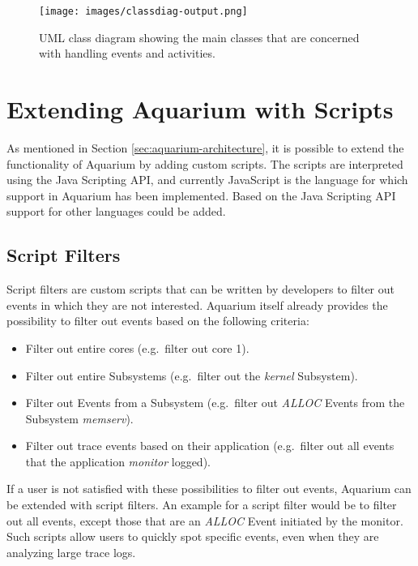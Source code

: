\documentclass[a4paper,11pt,twoside]{report}
\begin{document}
\begin{figure}[htb]
	\texttt{[image: images/classdiag-output.png]}
	\caption{UML class diagram showing the main classes that are concerned with
	handling events and activities.}
	\label{fig:classdiag-output}
\end{figure}

\section{Extending Aquarium with Scripts\label{sec:scripts}}

As mentioned in Section \ref{sec:aquarium-architecture}, it is possible to
extend the functionality of Aquarium by adding custom scripts. The scripts are
interpreted using the Java Scripting API, and currently JavaScript is the
language for which support in Aquarium has been implemented. Based on the Java
Scripting API support for other languages could be added.

\subsection{Script Filters}

Script filters are custom scripts that can be written by developers to filter
out events in which they are not interested. Aquarium itself already provides
the possibility to filter out events based on the following criteria:

\begin{itemize}
	\item Filter out entire cores (e.g.~filter out core 1).
	\item Filter out entire Subsystems (e.g.~filter out the \emph{kernel}
		Subsystem).
	\item Filter out Events from a Subsystem (e.g.~filter out \emph{ALLOC}
		Events from the Subsystem \emph{memserv}).
	\item Filter out trace events based on their application (e.g.~filter out
		all events that the application \emph{monitor} logged).
\end{itemize}

If a user is not satisfied with these possibilities to filter out events,
Aquarium can be extended with script filters. An example for a script filter
would be to filter out all events, except those that are an \emph{ALLOC} Event
initiated by the monitor. Such scripts allow users to quickly spot specific
events, even when they are analyzing large trace logs.
\end{document}
